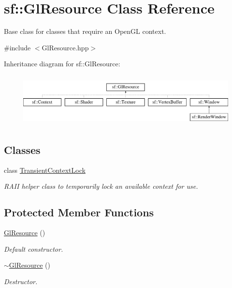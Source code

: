 \hypertarget{classsf_1_1_gl_resource}{}\section{sf\+:\+:Gl\+Resource Class Reference}
\label{classsf_1_1_gl_resource}


Base class for classes that require an Open\+GL context.  




{\ttfamily \#include $<$Gl\+Resource.\+hpp$>$}

Inheritance diagram for sf\+:\+:Gl\+Resource\+:\begin{figure}[H]
\begin{center}
\leavevmode
\includegraphics[height=2.776860cm]{classsf_1_1_gl_resource}
\end{center}
\end{figure}
\subsection*{Classes}
\begin{DoxyCompactItemize}
\item 
class \mbox{\hyperlink{classsf_1_1_gl_resource_1_1_transient_context_lock}{Transient\+Context\+Lock}}
\begin{DoxyCompactList}\small\item\em R\+A\+II helper class to temporarily lock an available context for use. \end{DoxyCompactList}\end{DoxyCompactItemize}
\subsection*{Protected Member Functions}
\begin{DoxyCompactItemize}
\item 
\mbox{\hyperlink{classsf_1_1_gl_resource_ad8fb7a0674f0f77e530dacc2a3b0dc6a}{Gl\+Resource}} ()
\begin{DoxyCompactList}\small\item\em Default constructor. \end{DoxyCompactList}\item 
\mbox{\hyperlink{classsf_1_1_gl_resource_ab99035b67052331d1e8cf67abd93de98}{$\sim$\+Gl\+Resource}} ()
\begin{DoxyCompactList}\small\item\em Destructor. \end{DoxyCompactList}\end{DoxyCompactItemize}

